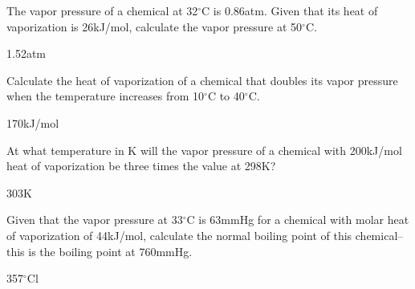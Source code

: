 \documentclass[main.tex]{subfiles}
\begin{document}
\begin{multicols*}{2}
\begin{question}[ID=\the\value{numA}]
The vapor pressure of a chemical at 32$^{\circ}$C is 0.86atm. Given that its heat of vaporization is 26kJ/mol, calculate the vapor pressure at 50$^{\circ}$C.
\end{question}
\begin{solution}
1.52atm
 \hspace{0.1cm}\end{solution}

\begin{question}[ID=\the\value{numA}]
Calculate the heat of vaporization of a chemical that doubles its vapor pressure when the temperature increases from 10$^{\circ}$C to 40$^{\circ}$C.
\end{question}
\begin{solution}
170kJ/mol
 \hspace{0.1cm}\end{solution}

\begin{question}[ID=\the\value{numA}]
At what temperature in K will the vapor pressure of a chemical with 200kJ/mol heat of vaporization be three times the value at 298K?
\end{question}
\begin{solution}
303K
 \hspace{0.1cm}\end{solution}

\begin{question}[ID=\the\value{numA}]
Given that the vapor pressure at 33$^{\circ}$C is 63mmHg for a chemical with molar heat of vaporization of 44kJ/mol, calculate the normal boiling point of this chemical--this is the boiling point at 760mmHg.
\end{question}
\begin{solution}
357$^{\circ}$Cl
 \hspace{0.1cm}\end{solution}


\end{multicols*}
\end{document}

